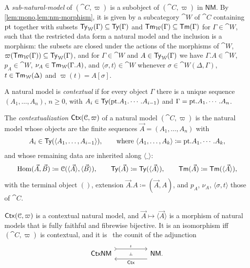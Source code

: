 \begin{definition}\label{def:sub-natural-model}
    A \emph{sub-natural-model} of $(\cat{C}, \varpi)$ is a subobject of $(\cat{C}, \varpi)$ in $\mathsf{NM}$. By \cref{lem:mono,lem:nm-morphism}, it is given by a subcategory $\cat{W}$ of $\cat{C}$ containing $\mathrm{pt}$ together with subsets $\mathsf{Ty}_{\mathcal{W}}(\Gamma) \subseteq \mathsf{Ty}(\Gamma)$ and $\mathsf{Tm}_{\mathcal{W}}(\Gamma) \subseteq \mathsf{Tm}(\Gamma)$ for $\Gamma \in \cat{W}$, such that the restricted data form a natural model and the inclusion is a morphism: the subsets are closed under the actions of the morphisms of $\cat{W}$, $\varpi(\mathsf{Tm}_{\mathcal{W}}(\Gamma)) \subseteq \mathsf{Ty}_{\mathcal{W}}(\Gamma)$, and for $\Gamma \in \cat{W}$ and $A \in \mathsf{Ty}_{\mathcal{W}}(\Gamma)$ we have $\Gamma.A \in \cat{W}$, $p_A \in \cat{W}$, $\nu_A \in \mathsf{Tm}_{\mathcal{W}}(\Gamma.A)$, and $\langle \sigma, t \rangle \in \cat{W}$ whenever $\sigma \in \cat{W}(\Delta, \Gamma)$, $t \in \mathsf{Tm}_{\mathcal{W}}(\Delta)$ and $\varpi(t) = A[\sigma]$.
\end{definition}

\begin{definition}\label{def:contextual}
    A natural model is \emph{contextual} if for every object $\Gamma$ there is a unique sequence $(A_1, \ldots, A_n)$, $n \geq 0$, with $A_i \in \mathsf{Ty}(\mathrm{pt}.A_1.\cdots.A_{i-1})$ and $\Gamma = \mathrm{pt}.A_1.\cdots.A_n$.

    The \emph{contextualization} $\mathsf{Ctx}(\mathcal{C}, \varpi)$ of a natural model $(\cat{C}, \varpi)$ is the natural model whose objects are the finite sequences $\vec{A} = (A_1, \ldots, A_n)$ with
    \[
        A_i \in \mathsf{Ty}(\langle A_1, \ldots, A_{i-1} \rangle), \qquad \text{where } \langle A_1, \ldots, A_k \rangle \coloneqq \mathrm{pt}.A_1.\cdots.A_k,
    \]
    and whose remaining data are inherited along $\langle \_ \rangle$:
    \[
        \operatorname{Hom}(\vec{A}, \vec{B}) \coloneqq \mathcal{C}(\langle \vec{A} \rangle, \langle \vec{B} \rangle), \qquad
        \mathsf{Ty}(\vec{A}) \coloneqq \mathsf{Ty}(\langle \vec{A} \rangle), \qquad
        \mathsf{Tm}(\vec{A}) \coloneqq \mathsf{Tm}(\langle \vec{A} \rangle),
    \]
    with the terminal object $()$, extension $\vec{A}.A \coloneqq (\vec{A}, A)$, and $p_A$, $\nu_A$, $\langle \sigma, t \rangle$ those of $\cat{C}$.
\end{definition}

\begin{proposition}\label{prop:contextualisation}
    $\mathsf{Ctx}(\mathcal{C}, \varpi)$ is a contextual natural model, and $\vec{A} \mapsto \langle \vec{A} \rangle$ is a morphism of natural models that is fully faithful and fibrewise bijective. It is an isomorphism iff $(\cat{C}, \varpi)$ is contextual, and it is~\cite[Prop.~48]{AhrensLumsdaineNorth2024} the counit of the adjunction
    \[\begin{tikzcd}
    	{\mathsf{CtxNM}} && {\mathsf{NM}.}
    	\arrow[""{name=0, anchor=center, inner sep=0}, "\iota", shift left=3, tail, from=1-1, to=1-3]
    	\arrow[""{name=1, anchor=center, inner sep=0}, "{\mathsf{Ctx}}", shift left=3, from=1-3, to=1-1]
    	\arrow["\dashv"{anchor=center, rotate=-90}, draw=none, from=0, to=1]
    \end{tikzcd}\]
\end{proposition}

